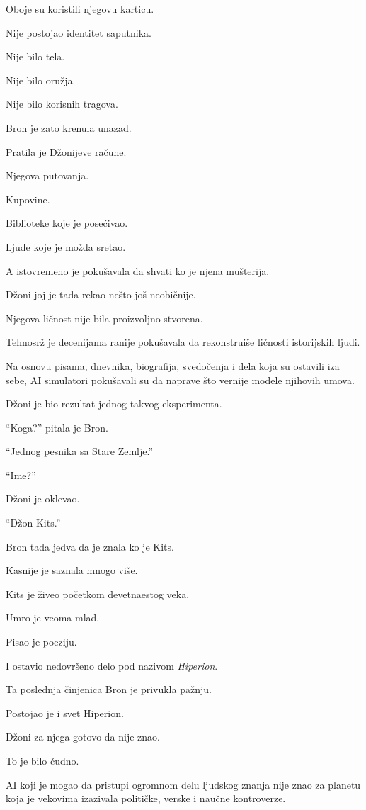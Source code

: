 Oboje su koristili njegovu karticu.

Nije postojao identitet saputnika.

Nije bilo tela.

Nije bilo oružja.

Nije bilo korisnih tragova.

Bron je zato krenula unazad.

Pratila je Džonijeve račune.

Njegova putovanja.

Kupovine.

Biblioteke koje je posećivao.

Ljude koje je možda sretao.

A istovremeno je pokušavala da shvati ko je njena mušterija.

\bigskip

Džoni joj je tada rekao nešto još neobičnije.

Njegova ličnost nije bila proizvoljno stvorena.

Tehnosrž je decenijama ranije pokušavala da rekonstruiše ličnosti istorijskih ljudi.

Na osnovu pisama, dnevnika, biografija, svedočenja i dela koja su ostavili iza sebe, AI simulatori pokušavali su da naprave što vernije modele njihovih umova.

Džoni je bio rezultat jednog takvog eksperimenta.

``Koga?'' pitala je Bron.

``Jednog pesnika sa Stare Zemlje.''

``Ime?''

Džoni je oklevao.

``Džon Kits.''

Bron tada jedva da je znala ko je Kits.

Kasnije je saznala mnogo više.

Kits je živeo početkom devetnaestog veka.

Umro je veoma mlad.

Pisao je poeziju.

I ostavio nedovršeno delo pod nazivom \emph{Hiperion}.

Ta poslednja činjenica Bron je privukla pažnju.

Postojao je i svet Hiperion.

Džoni za njega gotovo da nije znao.

To je bilo čudno.

AI koji je mogao da pristupi ogromnom delu ljudskog znanja nije znao za planetu koja je vekovima izazivala političke, verske i naučne kontroverze.

